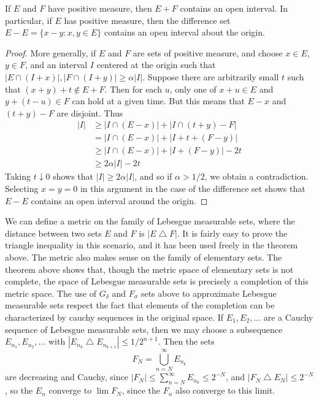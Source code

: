 \begin{corollary}
  If $E$ and $F$ have positive measure, then $E + F$ contains an open interval. In particular, if $E$ has positive measure, then the difference set $E - E = \{ x - y: x,y \in E \}$ contains an open interval about the origin.
\end{corollary}
\begin{proof}
  More generally, if $E$ and $F$ are sets of positive measure, and choose $x \in E$, $y \in F$, and an interval $I$ centered at the origin such that $|E \cap (I + x)|, |F \cap (I + y)| \geq \alpha |I|$. Suppose there are arbitrarily small $t$ such that $(x + y) + t \not \in E + F$. Then for each $u$, only one of $x + u \in E$ and $y + (t - u) \in F$ can hold at a given time. But this means that $E - x$ and $(t + y) - F$ are disjoint. Thus
  \begin{align*}
    |I| &\geq |I \cap (E - x)| + |I \cap (t + y) - F|\\
    &= |I \cap (E - x)| + |I+t + (F - y)|\\
    &\geq |I \cap (E - x)| + |I + (F - y)| - 2t\\
    &\geq 2 \alpha |I| - 2 t
  \end{align*}
  Taking $t \downarrow 0$ shows that $|I| \geq 2\alpha |I|$, and so if $\alpha > 1/2$, we obtain a contradiction. Selecting $x = y = 0$ in this argument in the case of the difference set shows that $E - E$ contains an open interval around the origin.
\end{proof}

We can define a metric on the family of Lebesgue measurable sets, where the distance between two sets $E$ and $F$ is $|E \bigtriangleup F|$. It is fairly easy to prove the triangle inequality in this scenario, and it has been used freely in the theorem above. The metric also makes sense on the family of elementary sets. The theorem above shows that, though the metric space of elementary sets is not complete, the space of Lebesgue measurable sets is precisely a completion of this metric space. The use of $G_\delta$ and $F_\sigma$ sets above to approximate Lebesgue measurable sets respect the fact that elements of the completion can be characterized by cauchy sequences in the original space. If $E_1, E_2, \dots$ are a Cauchy sequence of Lebesgue measurable sets, then we may choose a subsequence $E_{n_1}, E_{n_2}, \dots$ with $|E_{n_k} \bigtriangleup E_{n_{k+1}}| \leq 1/2^{n+1}$. Then the sets
  \[ F_N = \bigcup_{n = N}^\infty E_{n_k} \]
  are decreasing and Cauchy, since $|F_N| \leq \sum_{n = N}^\infty E_{n_k} \leq 2^{-N}$, and $|F_N \bigtriangleup E_N| \leq 2^{-N}$, so the $E_n$ converge to $\lim F_N$, since the $F_n$ also converge to this limit.

